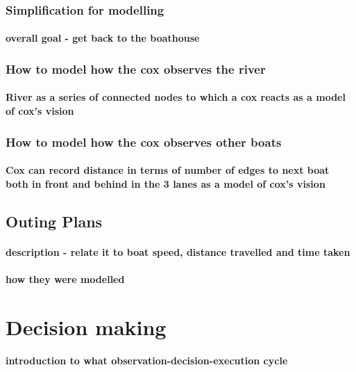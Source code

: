       \subsubsection{Simplification for modelling}
        \paragraph{overall goal - get back to the boathouse}
      \subsubsection{How to model how the cox observes the river}
        \paragraph{River as a series of connected nodes to which a cox reacts as a model of cox's vision}
      \subsubsection{How to model how the cox observes other boats}
        \paragraph{Cox can record distance in terms of number of edges to next boat both in front and behind in the 3 lanes as a model of cox's vision}
        

        

    
    \subsection{Outing Plans}
      \paragraph{description - relate it to boat speed, distance travelled and time taken}
      \paragraph{how they were modelled}
    
  \section{Decision making}
    \paragraph{introduction to what observation-decision-execution cycle}

